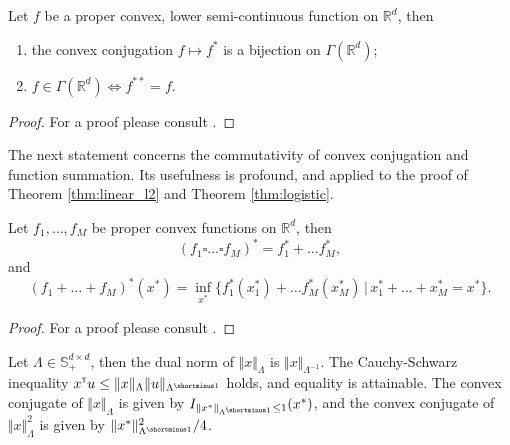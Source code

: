\documentclass[12pt]{article}
\begin{document}
\begin{theorem}
\label{thm:fenchel-moreau}
    Let $f$ be a proper convex, lower semi-continuous function on $\mathbb{R}^d$, then 
    \begin{enumerate}
        \item the convex conjugation $f\mapsto f^*$ is a bijection on $\Gamma\left(\mathbb{R}^d\right)$;
        \item $f\in \Gamma\left(\mathbb{R}^d\right) \iff f^{**} = f$.
    \end{enumerate}
\end{theorem}
\begin{proof}
    For a proof please consult \citep[Section 12]{rockafellar1970convex}.
\end{proof}

The next statement concerns the commutativity of convex conjugation and function summation. Its usefulness is profound, and applied to the proof of Theorem \ref{thm:linear_l2} and Theorem \ref{thm:logistic}.

\begin{theorem}
\label{thm:inf_conv}
    Let $f_1,\ldots,f_M$ be proper convex functions on $\mathbb{R}^d$, then \[
    (f_1\square\ldots\square f_M)^* = f_1^* +\ldots f_M^*,
    \]and \[
    (f_1+\ldots +f_M)^*(x^*) = \inf_{x^*}\{ f_1^*(x_1^*) + \ldots f_M^*(x_M^*)\, |\, x_1^*+\ldots +x_M^* = x^*\}.
    \]
\end{theorem}
\begin{proof}
    For a proof please consult \citep[Theorem 16.4]{rockafellar1970convex}.
\end{proof}

\begin{prop}
\label{prop:generalized_adaptive}
    Let $\Lambda\in \mathbb{S}_+^{d\times d}$, then the dual norm of $\Vert x\Vert_{\Lambda}$ is $\Vert x\Vert_{\Lambda^{-1}}.$ The Cauchy-Schwarz inequality $x\trans u \leq \Vert x\Vert_{\Lambda}\Vert u \Vert_{\Lambda^{\shortminus 1}}$ holds, and equality is attainable. The convex conjugate of $\Vert x\Vert_{\Lambda}$ is given by $I_{\Vert x^*\Vert_{\Lambda^{\shortminus 1}} \leq 1}(x^*)$, and the convex conjugate of $\Vert x\Vert_{\Lambda}^2$ is given by $\Vert x^*\Vert_{\Lambda^{\shortminus 1}}^2/4$.
\end{prop}
\end{document}
